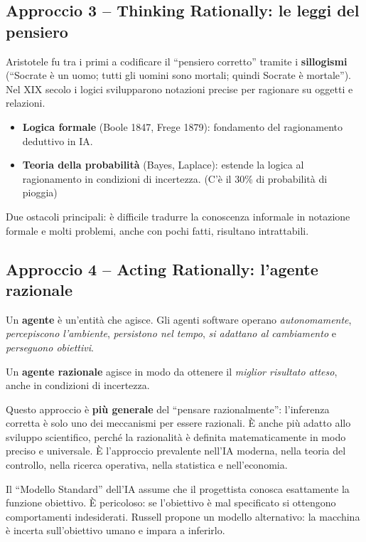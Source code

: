 \subsection{Approccio 3 -- Thinking Rationally: le leggi del pensiero}
Aristotele fu tra i primi a codificare il ``pensiero corretto'' tramite i \textbf{sillogismi} (``Socrate \`e un uomo; tutti gli uomini sono mortali; quindi Socrate \`e mortale''). Nel XIX secolo i logici svilupparono notazioni precise per ragionare su oggetti e relazioni.

\begin{itemize}
    \item \textbf{Logica formale} (Boole 1847, Frege 1879): fondamento del ragionamento deduttivo in IA.
    \item \textbf{Teoria della probabilit\`a} (Bayes, Laplace): estende la logica al ragionamento in condizioni di incertezza. (C'\`e il 30\% di probabilit\`a di pioggia)
\end{itemize}

Due ostacoli principali: \`e difficile tradurre la conoscenza informale in notazione formale e  molti problemi, anche con pochi fatti, risultano intrattabili.


\subsection{Approccio 4 -- Acting Rationally: l'agente razionale}
\begin{defbox}
Un \textbf{agente} \`e un'entit\`a che agisce. Gli agenti software operano \emph{autonomamente}, \emph{percepiscono l'ambiente}, \emph{persistono nel tempo}, \emph{si adattano al cambiamento} e \emph{perseguono obiettivi}.

Un \textbf{agente razionale} agisce in modo da ottenere il \emph{miglior risultato atteso}, anche in condizioni di incertezza.
\end{defbox}

Questo approccio \`e \textbf{pi\`u generale} del ``pensare razionalmente'': l'inferenza corretta \`e solo uno dei meccanismi per essere razionali. \`E anche pi\`u adatto allo sviluppo scientifico, perch\'e la razionalit\`a \`e definita matematicamente in modo preciso e universale. \`E l'approccio prevalente nell'IA moderna, nella teoria del controllo, nella ricerca operativa, nella statistica e nell'economia.

\begin{notebox}
Il ``Modello Standard'' dell'IA assume che il progettista conosca esattamente la funzione obiettivo. \`E pericoloso: se l'obiettivo \`e mal specificato si ottengono comportamenti indesiderati. Russell propone un modello alternativo: la macchina \`e incerta sull'obiettivo umano e impara a inferirlo.
\end{notebox}


